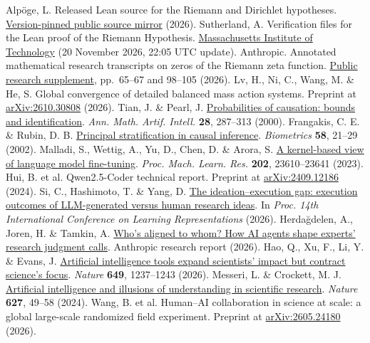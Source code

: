  Alpöge, L. Released Lean source for the Riemann and Dirichlet hypotheses. \href{https://github.com/Deicyde/riemann-hypothesis/tree/e50d09817ad81469f737e8f637561e6ccf86c670}{Version-pinned public source mirror} (2026).
 Sutherland, A. Verification files for the Lean proof of the Riemann Hypothesis. \href{https://math.mit.edu/~drew/grh/}{Massachusetts Institute of Technology} (20 November 2026, 22:05 UTC update).
 Anthropic. Annotated mathematical research transcripts on zeros of the Riemann zeta function. \href{https://assets.claude.com/8a0d1add3c637b858a9a181e98c40e9548c3f44f.pdf}{Public research supplement}, pp.~65--67 and 98--105 (2026).
 Lv, H., Ni, C., Wang, M. \& He, S. Global convergence of detailed balanced mass action systems. Preprint at \href{https://arxiv.org/abs/2610.30808}{arXiv:2610.30808} (2026).
 Tian, J. \& Pearl, J. \href{https://doi.org/10.1023/A:1018912507879}{Probabilities of causation: bounds and identification}. \textit{Ann. Math. Artif. Intell.} \textbf{28}, 287--313 (2000).
 Frangakis, C. E. \& Rubin, D. B. \href{https://doi.org/10.1111/j.0006-341X.2002.00021.x}{Principal stratification in causal inference}. \textit{Biometrics} \textbf{58}, 21--29 (2002).
 Malladi, S., Wettig, A., Yu, D., Chen, D. \& Arora, S. \href{https://proceedings.mlr.press/v202/malladi23a.html}{A kernel-based view of language model fine-tuning}. \textit{Proc. Mach. Learn. Res.} \textbf{202}, 23610--23641 (2023).
 Hui, B. et al. Qwen2.5-Coder technical report. Preprint at \href{https://arxiv.org/abs/2409.12186}{arXiv:2409.12186} (2024).
 Si, C., Hashimoto, T. \& Yang, D. \href{https://openreview.net/pdf?id=Fllp8l6Puy}{The ideation--execution gap: execution outcomes of LLM-generated versus human research ideas}. In \textit{Proc. 14th International Conference on Learning Representations} (2026).
 Herda\u{g}delen, A., Joren, H. \& Tamkin, A. \href{https://assets.claude.com/519c17a5d23a794e8b6d50a854048d0b61e0d73a.pdf}{Who's aligned to whom? How AI agents shape experts' research judgment calls}. Anthropic research report (2026).
 Hao, Q., Xu, F., Li, Y. \& Evans, J. \href{https://doi.org/10.1038/s41586-025-09922-y}{Artificial intelligence tools expand scientists' impact but contract science's focus}. \textit{Nature} \textbf{649}, 1237--1243 (2026).
 Messeri, L. \& Crockett, M. J. \href{https://doi.org/10.1038/s41586-024-07146-0}{Artificial intelligence and illusions of understanding in scientific research}. \textit{Nature} \textbf{627}, 49--58 (2024).
 Wang, B. et al. Human--AI collaboration in science at scale: a global large-scale randomized field experiment. Preprint at \href{https://arxiv.org/abs/2605.24180}{arXiv:2605.24180} (2026).
